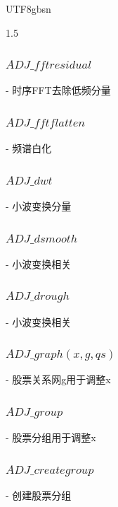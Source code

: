 \documentclass{article}
\begin{document}
\begin{CJK}{UTF8}{gbsn}
\begin{spacing}{1.5}
  \subsubsection{$ADJ\_fftresidual$}
   - 时序FFT去除低频分量 
  \subsubsection{$ADJ\_fftflatten$}
   - 频谱白化  
  \subsubsection{$ADJ\_dwt$}
   - 小波变换分量  
  \subsubsection{$ADJ\_dsmooth$}
   - 小波变换相关  
  \subsubsection{$ADJ\_drough$}
   - 小波变换相关  
 \subsubsection{$ADJ\_graph(x, g, qs)$}                
   - 股票关系网g用于调整x   
  \subsubsection{$ADJ\_group$}
   - 股票分组用于调整x  
  \subsubsection{$ADJ\_creategroup$}
   - 创建股票分组  














\end{spacing}
\end{CJK}
\end{document}
